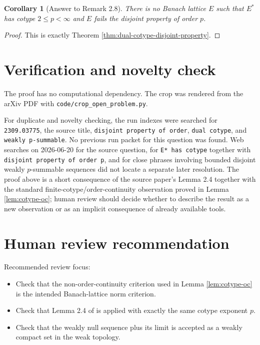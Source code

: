 \documentclass[11pt]{article}
\newtheorem{corollary}{Corollary}
\begin{document}
\begin{corollary}[Answer to Remark 2.8]\label{cor:answer}
There is no Banach lattice \(E\) such that \(E^*\) has cotype
\(2\le p<\infty\) and \(E\) fails the disjoint property of order \(p\).
\end{corollary}

\begin{proof}
This is exactly Theorem \ref{thm:dual-cotype-disjoint-property}.
\end{proof}

\section{Verification and novelty check}

The proof has no computational dependency.  The crop was rendered from the
arXiv PDF with \texttt{code/crop\_open\_problem.py}.

For duplicate and novelty checking, the run indexes were searched for
\texttt{2309.03775}, the source title, \texttt{disjoint property of order},
\texttt{dual cotype}, and \texttt{weakly p-summable}.  No previous run packet
for this question was found.  Web searches on 2026-06-20 for the source
question, for \texttt{E* has cotype} together with \texttt{disjoint property
of order p}, and for close phrases involving bounded disjoint weakly
\(p\)-summable sequences did not locate a separate later resolution.  The
proof above is a short consequence of the source paper's Lemma 2.4 together
with the standard finite-cotype/order-continuity observation proved in
Lemma \ref{lem:cotype-oc}; human review should decide whether to describe the
result as a new observation or as an implicit consequence of already available
tools.

\section{Human review recommendation}

Recommended review focus:
\begin{itemize}
\item Check that the non-order-continuity criterion used in
  Lemma \ref{lem:cotype-oc} is the intended Banach-lattice norm criterion.
\item Check that Lemma 2.4 of \cite{botelho-garcia-miranda} is applied with
  exactly the same cotype exponent \(p\).
\item Check that the weakly null sequence plus its limit is accepted as a
  weakly compact set in the weak topology.
\end{itemize}
\end{document}
